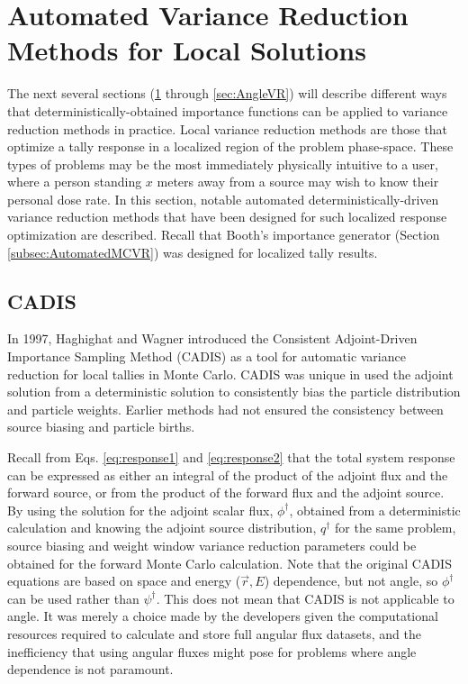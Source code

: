 \section{Automated Variance Reduction Methods for Local Solutions}
\label{sec:localVR}

The next several sections (\ref{sec:localVR} through \ref{sec:AngleVR})
will describe different ways that deterministically-obtained importance
functions
can be applied to variance reduction methods in practice. Local variance
reduction methods are those that optimize a tally response in a localized region
of the problem phase-space. These types of problems may be the most immediately
physically intuitive to a user,
where a person standing $x$ meters away from a source may wish to know their
personal dose rate. In this section, notable
automated deterministically-driven variance reduction methods that
have been designed for such localized response optimization are described.
Recall that Booth's importance generator (Section \ref{subsec:AutomatedMCVR})
was designed for localized tally results.

\subsection{CADIS}
\label{sec:CADIS}

In 1997, Haghighat and Wagner introduced the Consistent Adjoint-Driven
Importance Sampling Method (CADIS)
\cite{wagner_automatic_1997,wagner_automated_1998,haghighat_monte_2003} as a
tool for automatic variance reduction for local tallies in Monte Carlo. CADIS
was unique in used the adjoint solution from a deterministic solution to
consistently bias the particle distribution and particle weights. Earlier
methods had not ensured the consistency between source biasing and particle
births.

Recall from  Eqs. \eqref{eq:response1} and \eqref{eq:response2} that the total
system response can be expressed as either an integral of the product of the
adjoint flux and the forward source, or from the product of the forward flux and
the adjoint source. By using the solution for the adjoint scalar
flux, $\phi^{\dagger}$, obtained from a deterministic calculation
and knowing the adjoint source distribution, $q^{\dagger}$ for the same problem,
source biasing and weight window variance reduction parameters could be obtained
for the forward Monte Carlo calculation. Note that the original CADIS equations
are based on space and energy ($\vec{r}, E$) dependence, but not angle, so
$\phi^{\dagger}$ can be used rather than $\psi^{\dagger}$. This does not mean
that CADIS is not applicable to angle. It was merely a choice made by the
developers given the computational resources required to calculate and store
full angular flux datasets, and the inefficiency that using angular fluxes might
pose for problems where angle dependence is not paramount.

